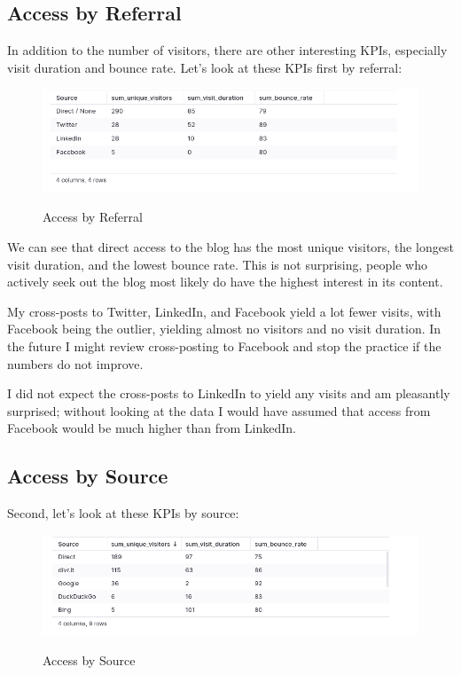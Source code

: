 \subsection{Access by Referral}

In addition to the number of visitors, there are other interesting KPIs, especially visit duration and bounce rate. Let's look at these KPIs first by referral:

\begin{figure}[H]
\centering
\caption {Access by Referral}
\includegraphics[width=\linewidth]{images/access-referral.png}
\label{fig:accessReferral}
\end{figure}

We can see that direct access to the blog has the most unique visitors, the longest visit duration, and the lowest bounce rate. This is not surprising, people who actively seek out the blog most likely do have the highest interest in its content.

My cross-posts to Twitter, LinkedIn, and Facebook yield a lot fewer visits, with Facebook being the outlier, yielding almost no visitors and no visit duration. In the future I might review cross-posting to Facebook and stop the practice if the numbers do not improve. 

I did not expect the cross-posts to LinkedIn to yield any visits and am pleasantly surprised; without looking at the data I would have assumed that access from Facebook would be much higher than from LinkedIn.

\subsection{Access by Source}

Second, let's look at these KPIs by source:

\begin{figure}[H]
\centering
\caption {Access by Source}
\includegraphics[width=\linewidth]{images/access-source.png}
\label{fig:accessSource}
\end{figure}

